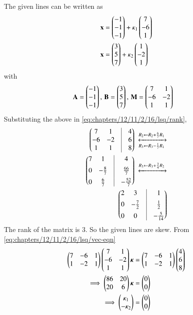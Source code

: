  The given lines  can be written as
\begin{align}
\label{eq:chapters/12/11/2/15/lines}
\begin{split}
\mathbf{x} &= \begin{pmatrix}-1\\-1\\-1\end{pmatrix} + \kappa_1\begin{pmatrix}7\\-6\\1\end{pmatrix}\\
\mathbf{x} &= \begin{pmatrix}3\\5\\7\end{pmatrix} + \kappa_2\begin{pmatrix}1\\-2\\1\end{pmatrix} 
\end{split}
\end{align}
with
\begin{align}
\mathbf{A} = \begin{pmatrix}-1\\-1\\-1\end{pmatrix},\, \mathbf{B} &= \begin{pmatrix}3\\5\\7\end{pmatrix},\,
\mathbf{M} = \begin{pmatrix}7&1\\-6&-2\\1&1\end{pmatrix}
\end{align}
%
Substituting the above in 
	    \eqref{eq:chapters/12/11/2/16/lsq/rank},
\begin{align}
\myvec{7&1&\vrule&4\\-6&-2&\vrule&6\\1&1&\vrule&8}
\xleftrightarrow[R_3 \leftarrow R_3 - \frac{1}{7}R_1]{R_2 \leftarrow R_2 + \frac{6}{7}R_1}\\
	\myvec{7&1&\vrule&4\\[1ex]0&-\frac{8}{7}&\vrule&\frac{66}{7}\\[1ex]0&\frac{6}{7}&\vrule&-\frac{52}{7}}
\xleftrightarrow{R_3 \leftarrow R_3 + \frac{3}{4}R_2}\\
\myvec{2&3&\vrule&1\\[1ex]0&-\frac{7}{2}&\vrule&\frac{1}{2}\\[1ex]0&0&\vrule&-\frac{5}{14}}
\end{align}
The rank of the matrix is 3. So the given lines are skew.
        From \eqref{eq:chapters/12/11/2/16/lsq/vec-eqn}
\begin{align}
\begin{pmatrix}7&-6&1\\1&-2&1\end{pmatrix} \begin{pmatrix}7&1\\-6&-2\\1&1\end{pmatrix}\bm{\kappa} &= \begin{pmatrix}7&-6&1\\1&-2&1\end{pmatrix} \begin{pmatrix}4\\6\\8\end{pmatrix}\\
\implies \begin{pmatrix}86&20\\20&6\end{pmatrix}\bm{\kappa} &= \begin{pmatrix}0\\0\end{pmatrix}
\label{eq:chapters/12/11/2/15/3}
\\
\implies \begin{pmatrix}\kappa_1\\-\kappa_2\end{pmatrix} &= \begin{pmatrix}0\\0\end{pmatrix}
\end{align}
